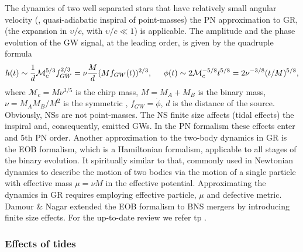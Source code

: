 The dynamics of two well separated stars that have relatively small angular velocity 
(\ie, quasi-adiabatic inspiral of point-masses) the \ac{PN} approximation to \ac{GR}, 
(the expansion in $\upsilon/c$, with $\upsilon/c\ll 1$) is applicable.
%
The amplitude and the phase evolution of the \ac{GW} signal, at the leading order, 
is given by the quadruple formula 
%
\begin{equation}
\label{eq:intro:gw_wave}
h(t) \sim \frac{1}{d}\mathcal{M}_c^{5/3} f_{GW}^{2/3} = \nu\frac{M}{d}(Mf_{GW}(t))^{2/3}, \hspace{5mm} \phi(t) \sim 2\mathcal{M}_c^{-5/8}t^{5/8} = 2\nu^{-3/8}(t/M)^{5/8},
\end{equation}
%
where $\mathcal{M}_c = M\nu^{3/5}$ is the chirp mass, $M = M_A + M_B$ is the binary mass, 
$\nu = M_A M_B/M^2$ is the symmetric \mr{}, $f_{GW} = \dot{\phi}$, $d$ is the distance of the source.
%
Obviously, \acp{NS} are not point-masses. The \ac{NS} finite size affects (tidal effects) the 
inspiral and, consequently, emitted \acp{GW}. In the \ac{PN} formalism these effects enter 
and $5$th \ac{PN} order.
%
%
Another approximation to the two-body dynamics in \ac{GR} is the \ac{EOB} formalism,
which is a Hamiltonian formalism, applicable to all stages of the binary evolution.
It spiritually similar to that, commonly used in Newtonian dynamics to 
describe the motion of two bodies via the motion of a single particle with effective mass 
$\mu=\nu M$ in the effective potential. Approximating the dynamics in \ac{GR} requires 
employing effective particle, $\mu$ and defective metric. 
%
Damour \& Nagar \cite{Damour:2009wj} extended the \ac{EOB} formalism to \ac{BNS} mergers by 
introducing finite size effects. For the up-to-date review we refer tp \cite{Damour:2012mv}.


\subsubsection{Effects of tides}

